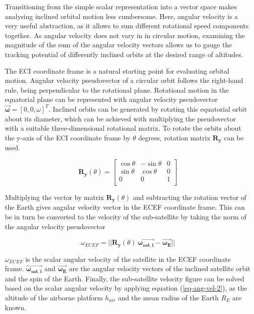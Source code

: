 \documentclass[english, 12pt, a4paper, elec, utf8, a-1b, online]{aaltothesis}
\begin{document}
Transitioning from the simple scalar representation into a vector space makes analysing inclined orbital motion less cumbersome.
Here, angular velocity is a very useful abstraction, as it allows to sum different rotational speed components together.
As angular velocity does not vary in in circular motion, examining the magnitude of the sum of the angular velocity vectors allows us to gauge the tracking potential of differently inclined orbits at the desired range of altitudes.

The ECI coordinate frame is a natural starting point for evaluating orbital motion.
Angular velocity pseudovector of a circular orbit follows the right-hand rule, being perpendicular to the rotational plane.
Rotational motion in the equatorial plane can be represented with angular velocity pseudovector $\bm{\vec{\omega}} = [0,0,\omega]^T$.
Inclined orbits can be generated by rotating this equatorial orbit about its diameter, which can be achieved with multiplying the pseudovector with a suitable three-dimensional rotational matrix.
To rotate the orbits about the y-axis of the ECI coordinate frame by $\theta$ degrees, rotation matrix $\bm{R_y}$ can be used.

\begin{equation*}
  \bm{R_y}(\theta) = \begin{bmatrix}
    \cos \theta & -\sin \theta & 0 \\[3pt]
    \sin \theta &  \cos \theta & 0 \\[3pt]
    0           &  0           & 1 \\
    \end{bmatrix}
\end{equation*}

Multiplying the vector by matrix $\bm{R_y}(\theta)$ and subtracting the rotation vector of the Earth gives angular velocity vector in the ECEF coordinate frame.
This can be in turn be converted to the velocity of the sub-satellite by taking the norm of the angular velocity pseudovector

\begin{equation*}
  \omega_{ECEF} =
  ||\bm{R_y}(\theta)\ \bm{\vec{\omega_{sat, i}}} - \bm{\vec{\omega_{E}}}||
\end{equation*}

$\omega_{ECEF}$ is the scalar angular velocity of the satellite in the ECEF coordinate frame.
$\bm{\vec{\omega_{sat, i}}}$ and $\bm{\vec{\omega_{E}}}$ are the angular velocity vectors of the inclined satellite orbit and the spin of the Earth.
Finally, the sub-satellite velocity figure can be solved based on the scalar angular velocity by applying equation (\ref{eq-ang-vel-2}), as the altitude of the airborne platform $h_{air}$ and the mean radius of the Earth $R_E$ are known.
\end{document}
